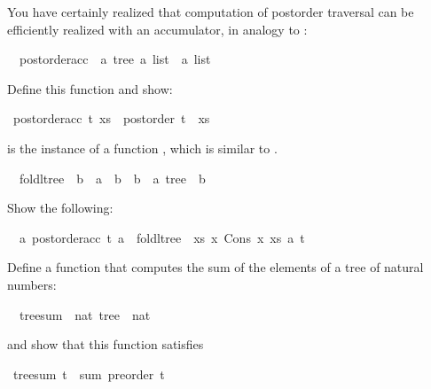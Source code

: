 \begin{isabellebody}
%
\begin{isamarkuptext}%
You have certainly realized that computation of postorder traversal can be efficiently realized with an accumulator, in analogy to  :%
\end{isamarkuptext}%
\isamarkuptrue%
\isanewline
\ \ postorder{\isacharunderscore}acc\ {\isacharcolon}{\isacharcolon}\ {\isachardoublequote}{\isacharbrackleft}{\isacharprime}a\ tree{\isacharcomma}\ {\isacharprime}a\ list{\isacharbrackright}\ {\isasymRightarrow}\ {\isacharprime}a\ list{\isachardoublequote}\isamarkupfalse%
%
\begin{isamarkuptext}%
Define this function and show:%
\end{isamarkuptext}%
\isamarkuptrue%
\ {\isachardoublequote}postorder{\isacharunderscore}acc\ t\ xs\ {\isacharequal}\ {\isacharparenleft}postorder\ t{\isacharparenright}\ {\isacharat}\ xs{\isachardoublequote}\isamarkupfalse%
\isamarkupfalse%
%
\begin{isamarkuptext}%
 is the instance of a function
, which is similar to .%
\end{isamarkuptext}%
\isamarkuptrue%
\isanewline
\ \ foldl{\isacharunderscore}tree\ {\isacharcolon}{\isacharcolon}\ {\isachardoublequote}{\isacharparenleft}{\isacharprime}b\ {\isacharequal}{\isachargreater}\ {\isacharprime}a\ {\isacharequal}{\isachargreater}\ {\isacharprime}b{\isacharparenright}\ {\isasymRightarrow}\ {\isacharprime}b\ {\isasymRightarrow}\ {\isacharprime}a\ tree\ {\isasymRightarrow}\ {\isacharprime}b{\isachardoublequote}\isamarkupfalse%
%
\begin{isamarkuptext}%
Show the following:%
\end{isamarkuptext}%
\isamarkuptrue%
\ {\isachardoublequote}{\isasymforall}\ a{\isachardot}\ postorder{\isacharunderscore}acc\ t\ a\ {\isacharequal}\ foldl{\isacharunderscore}tree\ {\isacharparenleft}{\isasymlambda}\ xs\ x{\isachardot}\ Cons\ x\ xs{\isacharparenright}\ a\ t{\isachardoublequote}\isamarkupfalse%
\isamarkupfalse%
%
\begin{isamarkuptext}%
Define a function  that computes the sum of
the elements of a tree of natural numbers:%
\end{isamarkuptext}%
\isamarkuptrue%
\isanewline
\ \ tree{\isacharunderscore}sum\ {\isacharcolon}{\isacharcolon}\ {\isachardoublequote}nat\ tree\ {\isasymRightarrow}\ nat{\isachardoublequote}\isamarkupfalse%
%
\begin{isamarkuptext}%
and show that this function satisfies%
\end{isamarkuptext}%
\isamarkuptrue%
\ {\isachardoublequote}tree{\isacharunderscore}sum\ t\ {\isacharequal}\ sum\ {\isacharparenleft}preorder\ t{\isacharparenright}{\isachardoublequote}\isamarkupfalse%
\isanewline
\isamarkupfalse%
\isanewline
\isamarkupfalse%
\end{isabellebody}%
